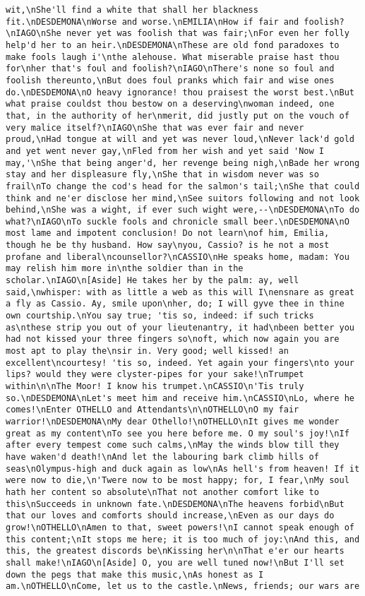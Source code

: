 \begin{verbatim}
wit,\nShe'll find a white that shall her blackness fit.\nDESDEMONA\nWorse and worse.\nEMILIA\nHow if fair and foolish?\nIAGO\nShe never yet was foolish that was fair;\nFor even her folly help'd her to an heir.\nDESDEMONA\nThese are old fond paradoxes to make fools laugh i'\nthe alehouse. What miserable praise hast thou for\nher that's foul and foolish?\nIAGO\nThere's none so foul and foolish thereunto,\nBut does foul pranks which fair and wise ones do.\nDESDEMONA\nO heavy ignorance! thou praisest the worst best.\nBut what praise couldst thou bestow on a deserving\nwoman indeed, one that, in the authority of her\nmerit, did justly put on the vouch of very malice itself?\nIAGO\nShe that was ever fair and never proud,\nHad tongue at will and yet was never loud,\nNever lack'd gold and yet went never gay,\nFled from her wish and yet said 'Now I may,'\nShe that being anger'd, her revenge being nigh,\nBade her wrong stay and her displeasure fly,\nShe that in wisdom never was so frail\nTo change the cod's head for the salmon's tail;\nShe that could think and ne'er disclose her mind,\nSee suitors following and not look behind,\nShe was a wight, if ever such wight were,--\nDESDEMONA\nTo do what?\nIAGO\nTo suckle fools and chronicle small beer.\nDESDEMONA\nO most lame and impotent conclusion! Do not learn\nof him, Emilia, though he be thy husband. How say\nyou, Cassio? is he not a most profane and liberal\ncounsellor?\nCASSIO\nHe speaks home, madam: You may relish him more in\nthe soldier than in the scholar.\nIAGO\n[Aside] He takes her by the palm: ay, well said,\nwhisper: with as little a web as this will I\nensnare as great a fly as Cassio. Ay, smile upon\nher, do; I will gyve thee in thine own courtship.\nYou say true; 'tis so, indeed: if such tricks as\nthese strip you out of your lieutenantry, it had\nbeen better you had not kissed your three fingers so\noft, which now again you are most apt to play the\nsir in. Very good; well kissed! an excellent\ncourtesy! 'tis so, indeed. Yet again your fingers\nto your lips? would they were clyster-pipes for your sake!\nTrumpet within\n\nThe Moor! I know his trumpet.\nCASSIO\n'Tis truly so.\nDESDEMONA\nLet's meet him and receive him.\nCASSIO\nLo, where he comes!\nEnter OTHELLO and Attendants\n\nOTHELLO\nO my fair warrior!\nDESDEMONA\nMy dear Othello!\nOTHELLO\nIt gives me wonder great as my content\nTo see you here before me. O my soul's joy!\nIf after every tempest come such calms,\nMay the winds blow till they have waken'd death!\nAnd let the labouring bark climb hills of seas\nOlympus-high and duck again as low\nAs hell's from heaven! If it were now to die,\n'Twere now to be most happy; for, I fear,\nMy soul hath her content so absolute\nThat not another comfort like to this\nSucceeds in unknown fate.\nDESDEMONA\nThe heavens forbid\nBut that our loves and comforts should increase,\nEven as our days do grow!\nOTHELLO\nAmen to that, sweet powers!\nI cannot speak enough of this content;\nIt stops me here; it is too much of joy:\nAnd this, and this, the greatest discords be\nKissing her\n\nThat e'er our hearts shall make!\nIAGO\n[Aside] O, you are well tuned now!\nBut I'll set down the pegs that make this music,\nAs honest as I am.\nOTHELLO\nCome, let us to the castle.\nNews, friends; our wars are 
\end{verbatim}
